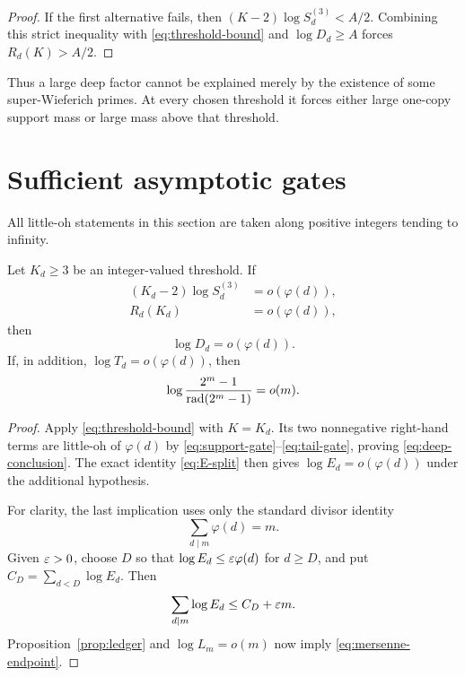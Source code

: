 \begin{proof}
If the first alternative fails, then
$(K-2)\log S_d^{(3)}<A/2$.  Combining this strict inequality with
\eqref{eq:threshold-bound} and $\log D_d\ge A$ forces
$R_d(K)>A/2$.
\end{proof}

Thus a large deep factor cannot be explained merely by the existence of
some super-Wieferich primes.  At every chosen threshold it forces either
large one-copy support mass or large mass above that threshold.

\section{Sufficient asymptotic gates}
\label{sec:gates}

All little-oh statements in this section are taken along positive integers
tending to infinity.

\begin{theorem}
\label{thm:moving-threshold}
Let $K_d\ge3$ be an integer-valued threshold.  If
\begin{align}
 (K_d-2)\log S_d^{(3)}&=o(\varphi(d)),
 \label{eq:support-gate}\\
 R_d(K_d)&=o(\varphi(d)),
 \label{eq:tail-gate}
\end{align}
then
\begin{equation}
                         \log D_d=o(\varphi(d)).
 \label{eq:deep-conclusion}
\end{equation}
If, in addition, $\log T_d=o(\varphi(d))$, then
\begin{equation}
 \log\frac{2^m-1}{\operatorname{rad}(2^m-1)}=o(m).
 \label{eq:mersenne-endpoint}
\end{equation}
\end{theorem}

\begin{proof}
Apply \eqref{eq:threshold-bound} with $K=K_d$.  Its two nonnegative
right-hand terms are little-oh of $\varphi(d)$ by
\eqref{eq:support-gate}--\eqref{eq:tail-gate}, proving
\eqref{eq:deep-conclusion}.  The exact identity \eqref{eq:E-split} then
gives $\log E_d=o(\varphi(d))$ under the additional hypothesis.

For clarity, the last implication uses only the standard divisor identity
\[
                         \sum_{d\mid m}\varphi(d)=m.
\]
Given $\varepsilon>0$, choose $D$ so that
$\log E_d\le\varepsilon\varphi(d)$ for $d\ge D$, and put
$C_D=\sum_{d<D}\log E_d$.  Then
\[
 \sum_{d\mid m}\log E_d\le C_D+\varepsilon m.
\]
Proposition~\ref{prop:ledger} and $\log L_m=o(m)$ now imply
\eqref{eq:mersenne-endpoint}.
\end{proof}

